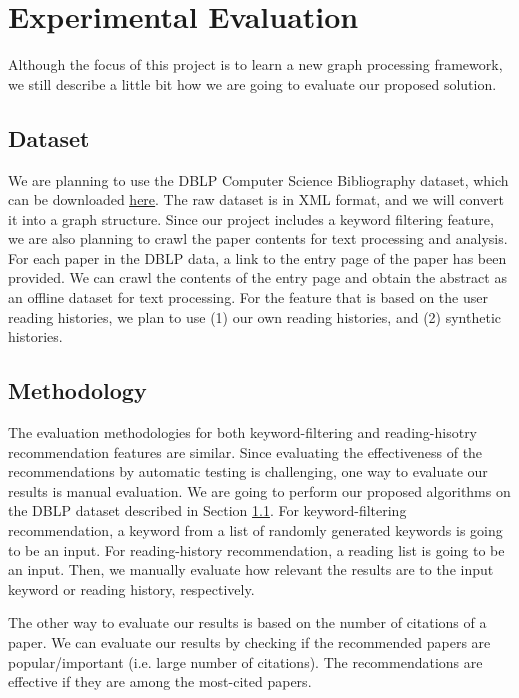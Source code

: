 \section{Experimental Evaluation}
%
Although the focus of this project is to learn a new graph processing framework, we still describe a little bit how we are going to evaluate our proposed solution.
%
\subsection{Dataset} \label{dataset}
%
We are planning to use the DBLP Computer Science Bibliography dataset, which can be downloaded \href{https://dblp.uni-trier.de/xml/}{\underline{here}}.
%
The raw dataset is in XML format, and we will convert it into a graph structure.
%
Since our project includes a keyword filtering feature, we are also planning to crawl the paper contents for text processing and analysis.
%
For each paper in the DBLP data, a link to the entry page of the paper has been provided.
%
We can crawl the contents of the entry page and obtain the abstract as an offline dataset for text processing.
%
For the feature that is based on the user reading histories, we plan to use (1) our own reading histories, and (2) synthetic histories.
%
\subsection{Methodology}
%
The evaluation methodologies for both keyword-filtering and reading-hisotry recommendation features are similar.
%
Since evaluating the effectiveness of the recommendations by automatic testing is challenging, one way to evaluate our results is manual evaluation.
%
We are going to perform our proposed algorithms on the DBLP dataset described in Section \ref{dataset}.
%
For keyword-filtering recommendation, a keyword from a list of randomly generated keywords is going to be an input.
%
For reading-history recommendation, a reading list is going to be an input.
%
Then, we manually evaluate how relevant the results are to the input keyword or reading history, respectively.
%

The other way to evaluate our results is based on the number of citations of a paper.
%
We can evaluate our results by checking if the recommended papers are popular/important (i.e. large number of citations).
%
The recommendations are effective if they are among the most-cited papers.
